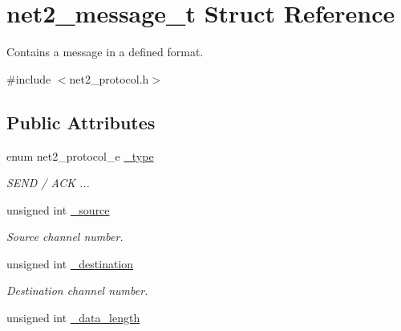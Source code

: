 \hypertarget{structnet2__message__t}{\section{net2\-\_\-message\-\_\-t Struct Reference}
\label{structnet2__message__t}
}


Contains a message in a defined format.  




{\ttfamily \#include $<$net2\-\_\-protocol.\-h$>$}

\subsection*{Public Attributes}
\begin{DoxyCompactItemize}
\item 
\hypertarget{structnet2__message__t_adbbcead2b82a531c89222ee6c0ffbc2c}{enum net2\-\_\-protocol\-\_\-e \hyperlink{structnet2__message__t_adbbcead2b82a531c89222ee6c0ffbc2c}{\-\_\-type}}\label{structnet2__message__t_adbbcead2b82a531c89222ee6c0ffbc2c}

\begin{DoxyCompactList}\small\item\em S\-E\-N\-D / A\-C\-K ... \end{DoxyCompactList}\item 
\hypertarget{structnet2__message__t_a391092232c3e5103f92632e192b31a71}{unsigned int \hyperlink{structnet2__message__t_a391092232c3e5103f92632e192b31a71}{\-\_\-source}}\label{structnet2__message__t_a391092232c3e5103f92632e192b31a71}

\begin{DoxyCompactList}\small\item\em Source channel number. \end{DoxyCompactList}\item 
\hypertarget{structnet2__message__t_a86405418417e82e30ab57a5d35ee3fc9}{unsigned int \hyperlink{structnet2__message__t_a86405418417e82e30ab57a5d35ee3fc9}{\-\_\-destination}}\label{structnet2__message__t_a86405418417e82e30ab57a5d35ee3fc9}

\begin{DoxyCompactList}\small\item\em Destination channel number. \end{DoxyCompactList}\item 
\hypertarget{structnet2__message__t_a29ff000a3e877e88c84500a952fed7d1}{unsigned int \hyperlink{structnet2__message__t_a29ff000a3e877e88c84500a952fed7d1}{\-\_\-data\-\_\-length}}\label{structnet2__message__t_a29ff000a3e877e88c84500a952fed7d1}


\end{DoxyCompactItemize}
